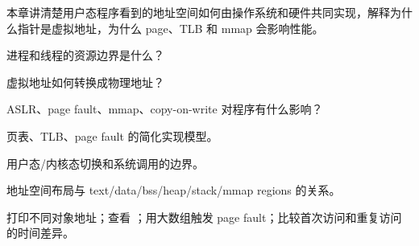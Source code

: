{本章讲清楚用户态程序看到的地址空间如何由操作系统和硬件共同实现，解释为什么指针是虚拟地址，为什么 page、TLB 和 mmap 会影响性能。}
{\item 进程和线程的资源边界是什么？
\item 虚拟地址如何转换成物理地址？
\item ASLR、page fault、mmap、copy-on-write 对程序有什么影响？}
{\item 页表、TLB、page fault 的简化实现模型。
\item 用户态/内核态切换和系统调用的边界。
\item 地址空间布局与 text/data/bss/heap/stack/mmap regions 的关系。}
{打印不同对象地址；查看 ；用大数组触发 page fault；比较首次访问和重复访问的时间差异。}
